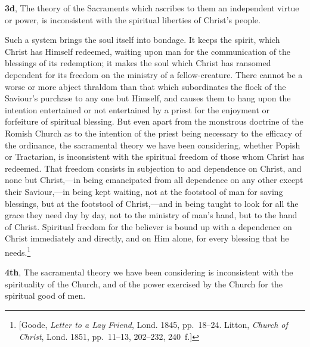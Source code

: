 \documentclass[
  english,
]{book}
\begin{document}
\textbf{3d}, The theory of the Sacraments which ascribes to them an independent virtue or power, is inconsistent with the spiritual liberties of Christ's people.

Such a system brings the soul itself into bondage. It keeps the spirit, which Christ has Himself redeemed, waiting upon man for the communication of the blessings of its redemption; it makes the soul which Christ has ransomed dependent for its freedom on the ministry of a fellow-creature. There cannot be a worse or more abject thraldom than that which subordinates the flock of the Saviour's purchase to any one but Himself, and causes them to hang upon the intention entertained or not entertained by a priest for the enjoyment or forfeiture of spiritual blessing. But even apart from the monstrous doctrine of the Romish Church as to the intention of the priest being necessary to the efficacy of the ordinance, the sacramental theory we have been considering, whether Popish or Tractarian, is inconsistent with the spiritual freedom of those whom Christ has redeemed. That freedom consists in subjection to and dependence on Christ, and none but Christ,---in being emancipated from all dependence on any other except their Saviour,---in being kept waiting, not at the footstool of man for saving blessings, but at the footstool of Christ,---and in being taught to look for all the grace they need day by day, not to the ministry of man's hand, but to the hand of Christ. Spiritual freedom for the believer is bound up with a dependence on Christ immediately and directly, and on Him alone, for every blessing that he needs.\footnote{{[}Goode, \emph{Letter to a Lay Friend}, Lond. 1845, pp.~18--24. Litton, \emph{Church of Christ}, Lond. 1851, pp.~11--13, 202--232, 240~f.{]}}

\textbf{4th}, The sacramental theory we have been considering is inconsistent with the spirituality of the Church, and of the power exercised by the Church for the spiritual good of men.
\end{document}
